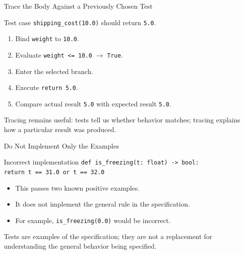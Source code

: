 \documentclass[aspectratio=169,10pt]{beamer}
\begin{document}
\begin{frame}{Trace the Body Against a Previously Chosen Test}
  \begin{block}{Test case}
    \texttt{shipping\_cost(10.0)} should return \texttt{5.0}.
  \end{block}

  \begin{enumerate}
    \item Bind \texttt{weight} to \texttt{10.0}.
    \item Evaluate \texttt{weight <= 10.0} $\rightarrow$ \texttt{True}.
    \item Enter the selected branch.
    \item Execute \texttt{return 5.0}.
    \item Compare actual result \texttt{5.0} with expected result \texttt{5.0}.
  \end{enumerate}

  \begin{keyidea}
    Tracing remains useful: tests tell us whether behavior matches; tracing explains how a particular result was produced.
  \end{keyidea}
\end{frame}

\begin{frame}{Do Not Implement Only the Examples}
  \begin{alertblock}{Incorrect implementation}
    \texttt{def is\_freezing(t: float) -> bool:}\\
    \hspace*{0.20in}\texttt{return t == 31.0 or t == 32.0}
  \end{alertblock}

  \begin{itemize}
    \item This passes two known positive examples.
    \item It does not implement the general rule in the specification.
    \item For example, \texttt{is\_freezing(0.0)} would be incorrect.
  \end{itemize}

  \begin{keyidea}
    Tests are examples of the specification; they are not a replacement for understanding the general behavior being specified.
  \end{keyidea}
\end{frame}

\end{document}
